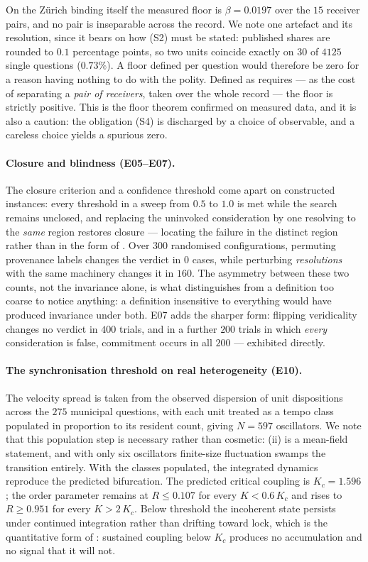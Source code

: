 \documentclass[11pt,a4paper]{article}
\theoremstyle{clstyle}
\theoremstyle{definition}
\theoremstyle{remark}
\newcommand{\flo}{\beta}
\newcommand{\Ord}{R}
\newcommand{\Kc}{K_{c}}
\begin{document}
On the Z{\"u}rich binding itself the measured floor is $\flo=0.0197$ over the
$15$ receiver pairs, and no pair is inseparable across the record. We note
one artefact and its resolution, since it bears on how (S2) must be stated:
published shares are rounded to $0.1$ percentage points, so two units
coincide exactly on $30$ of $4125$ single questions ($0.73\%$). A floor defined
per question would therefore be zero for a reason having nothing to do with
the polity. Defined as  requires --- as the cost of separating a
\emph{pair of receivers}, taken over the whole record --- the floor is
strictly positive. This is the floor theorem confirmed on measured data, and
it is also a caution: the obligation (S4) is discharged by a choice of
observable, and a careless choice yields a spurious zero.

\paragraph{Closure and blindness (E05--E07).} The closure criterion and a
confidence threshold come apart on constructed instances: every threshold in
a sweep from $0.5$ to $1.0$ is met while the search remains unclosed, and
replacing the uninvoked consideration by one resolving to the \emph{same}
region restores closure --- locating the failure in the distinct region
rather than in the form of . Over $300$ randomised
configurations, permuting provenance labels changes the verdict in $0$
cases, while perturbing \emph{resolutions} with the same machinery changes it
in $160$. The asymmetry between these two counts, not the invariance alone, is
what distinguishes  from a definition too coarse to notice
anything: a definition insensitive to everything would have produced
invariance under both. E07 adds the sharper form: flipping veridicality
changes no verdict in $400$ trials, and in a further $200$ trials in which
\emph{every} consideration is false, commitment occurs in all $200$ ---
 exhibited directly.

\paragraph{The synchronisation threshold on real heterogeneity (E10).} The
velocity spread is taken from the observed dispersion of unit dispositions
across the $275$ municipal questions, with each unit treated as a tempo class
populated in proportion to its resident count, giving $N=597$ oscillators. We
note that this population step is necessary rather than cosmetic:
(ii) is a mean-field statement, and with only six
oscillators finite-size fluctuation swamps the transition entirely. With the
classes populated, the integrated dynamics reproduce the predicted
bifurcation. The predicted critical coupling is $\Kc=1.596$; the order
parameter remains at $\Ord\le0.107$ for every $K<0.6\,\Kc$ and rises to
$\Ord\ge0.951$ for every $K>2\,\Kc$. Below threshold the incoherent state
persists under continued integration rather than drifting toward lock, which
is the quantitative form of : sustained coupling below
$\Kc$ produces no accumulation and no signal that it will not.
\end{document}
